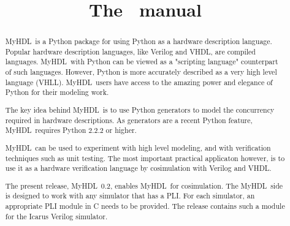\documentclass{manual}
\title{The \myhdl\ manual}
\newcommand{\myhdl}{\protect \mbox{MyHDL}}
\begin{document}
\maketitle



\begin{abstract}

\noindent

\myhdl\ is a Python package for using Python as a hardware description
language. Popular hardware description languages, like Verilog and
VHDL, are compiled languages. \myhdl\ with Python can be viewed as a
"scripting language" counterpart of such languages. However, Python is
more accurately described as a very high level language
(VHLL). \myhdl\ users have access to the amazing power and elegance of
Python for their modeling work.

The key idea behind \myhdl\ is to use Python generators to model the
concurrency required in hardware descriptions. As generators are a
recent Python feature, \myhdl\ requires Python 2.2.2 or higher.

\myhdl\ can be used to experiment with high level modeling, and with
verification techniques such as unit testing. The most important
practical applicaton however, is to use it as a hardware verification
language by cosimulation with Verilog and VHDL.

The present release, \myhdl\ 0.2, enables \myhdl\ for
cosimulation. The \myhdl\ side is designed to work with any simulator
that has a PLI. For each simulator, an appropriate PLI module in C
needs to be provided. The release contains such a module for the
Icarus Verilog simulator.


\end{abstract}

\tableofcontents







\end{document}
